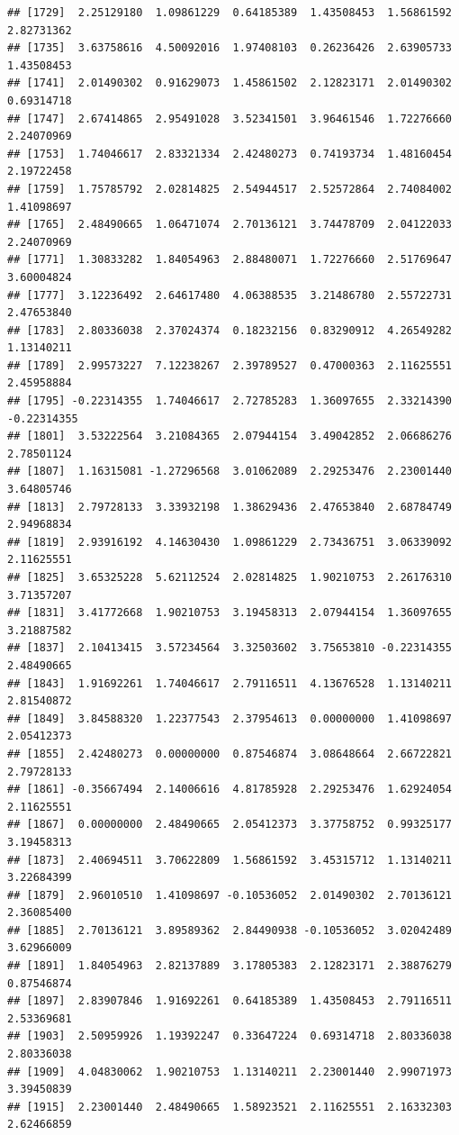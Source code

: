 \documentclass[
]{article}
\begin{document}
\begin{verbatim}
## [1729]  2.25129180  1.09861229  0.64185389  1.43508453  1.56861592  2.82731362
## [1735]  3.63758616  4.50092016  1.97408103  0.26236426  2.63905733  1.43508453
## [1741]  2.01490302  0.91629073  1.45861502  2.12823171  2.01490302  0.69314718
## [1747]  2.67414865  2.95491028  3.52341501  3.96461546  1.72276660  2.24070969
## [1753]  1.74046617  2.83321334  2.42480273  0.74193734  1.48160454  2.19722458
## [1759]  1.75785792  2.02814825  2.54944517  2.52572864  2.74084002  1.41098697
## [1765]  2.48490665  1.06471074  2.70136121  3.74478709  2.04122033  2.24070969
## [1771]  1.30833282  1.84054963  2.88480071  1.72276660  2.51769647  3.60004824
## [1777]  3.12236492  2.64617480  4.06388535  3.21486780  2.55722731  2.47653840
## [1783]  2.80336038  2.37024374  0.18232156  0.83290912  4.26549282  1.13140211
## [1789]  2.99573227  7.12238267  2.39789527  0.47000363  2.11625551  2.45958884
## [1795] -0.22314355  1.74046617  2.72785283  1.36097655  2.33214390 -0.22314355
## [1801]  3.53222564  3.21084365  2.07944154  3.49042852  2.06686276  2.78501124
## [1807]  1.16315081 -1.27296568  3.01062089  2.29253476  2.23001440  3.64805746
## [1813]  2.79728133  3.33932198  1.38629436  2.47653840  2.68784749  2.94968834
## [1819]  2.93916192  4.14630430  1.09861229  2.73436751  3.06339092  2.11625551
## [1825]  3.65325228  5.62112524  2.02814825  1.90210753  2.26176310  3.71357207
## [1831]  3.41772668  1.90210753  3.19458313  2.07944154  1.36097655  3.21887582
## [1837]  2.10413415  3.57234564  3.32503602  3.75653810 -0.22314355  2.48490665
## [1843]  1.91692261  1.74046617  2.79116511  4.13676528  1.13140211  2.81540872
## [1849]  3.84588320  1.22377543  2.37954613  0.00000000  1.41098697  2.05412373
## [1855]  2.42480273  0.00000000  0.87546874  3.08648664  2.66722821  2.79728133
## [1861] -0.35667494  2.14006616  4.81785928  2.29253476  1.62924054  2.11625551
## [1867]  0.00000000  2.48490665  2.05412373  3.37758752  0.99325177  3.19458313
## [1873]  2.40694511  3.70622809  1.56861592  3.45315712  1.13140211  3.22684399
## [1879]  2.96010510  1.41098697 -0.10536052  2.01490302  2.70136121  2.36085400
## [1885]  2.70136121  3.89589362  2.84490938 -0.10536052  3.02042489  3.62966009
## [1891]  1.84054963  2.82137889  3.17805383  2.12823171  2.38876279  0.87546874
## [1897]  2.83907846  1.91692261  0.64185389  1.43508453  2.79116511  2.53369681
## [1903]  2.50959926  1.19392247  0.33647224  0.69314718  2.80336038  2.80336038
## [1909]  4.04830062  1.90210753  1.13140211  2.23001440  2.99071973  3.39450839
## [1915]  2.23001440  2.48490665  1.58923521  2.11625551  2.16332303  2.62466859

\end{verbatim}
\end{document}
